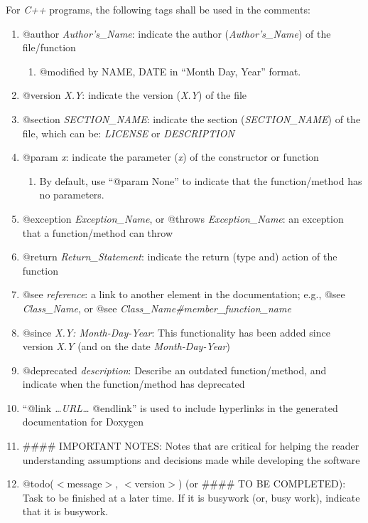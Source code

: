 \documentclass[letter,12pt]{article}
\begin{document}
For {\it C++} programs, the following tags shall be used in the comments: \vspace{-0.3cm}
\begin{enumerate} \itemsep -4pt
\item @author {\it Author's\_Name}: indicate the author ({\it Author's\_Name}) of the file/function \vspace{-0.3cm}
	\begin{enumerate} \itemsep -2pt
	\item @modified by NAME, DATE in ``Month Day, Year'' format.
	\end{enumerate}
\item @version {\it X.Y}: indicate the version ({\it X.Y}) of the file
\item @section {\it SECTION\_NAME}: indicate the section ({\it SECTION\_NAME}) of the file, which can be: {\it LICENSE} or {\it DESCRIPTION}
\item @param {\it x}: indicate the parameter ({\it x}) of the constructor or function \vspace{-0.3cm}
	\begin{enumerate} \itemsep -2pt
	\item By default, use ``@param None'' to indicate that the function/method has no parameters.
	\end{enumerate}
\item @exception {\it Exception\_Name}, or @throws {\it Exception\_Name}: an exception that a function/method can throw
\item @return {\it Return\_Statement}: indicate the return (type and) action of the function
\item @see {\it reference}: a link to another element in the documentation; e.g., @see {\it Class\_Name}, or @see {\it Class\_Name\#member\_function\_name}
\item @since {\it X.Y: Month-Day-Year}: This functionality has been added since version {\it X.Y} (and on the date {\it Month-Day-Year})
\item @deprecated {\it description}: Describe an outdated function/method, and indicate when the function/method has deprecated
\item ``@link {\it \dots URL\dots} @endlink'' is used to include hyperlinks in the generated documentation for Doxygen
\item \#\#\#\# IMPORTANT NOTES: Notes that are critical for helping the reader understanding assumptions and decisions made while developing the software
\item @todo($<$message$>$, $<$version$>$) (or \#\#\#\# TO BE COMPLETED): Task to be finished at a later time. If it is busywork (or, busy work), indicate that it is busywork.

\end{enumerate}
\end{document}
